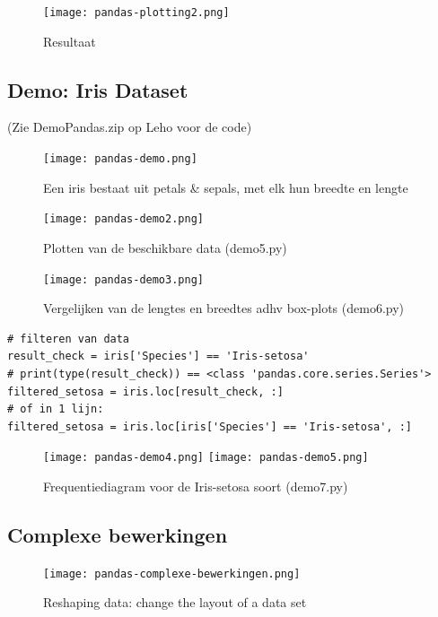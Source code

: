 \documentclass{article}
\begin{document}
\begin{figure}[H]
    \centering
    \texttt{[image: pandas-plotting2.png]}
    \caption{Resultaat}
\end{figure}

\subsection{Demo: Iris Dataset}

(Zie DemoPandas.zip op Leho voor de code)

\begin{figure}[H]
    \centering
    \texttt{[image: pandas-demo.png]}
    \caption{Een iris bestaat uit petals \& sepals, met elk hun breedte en lengte}
\end{figure}

\begin{figure}[H]
    \centering
    \texttt{[image: pandas-demo2.png]}
    \caption{Plotten van de beschikbare data (demo5.py)}
\end{figure}

\begin{figure}[H]
    \centering
    \texttt{[image: pandas-demo3.png]}
    \caption{Vergelijken van de lengtes en breedtes adhv box-plots (demo6.py)}
\end{figure}

\begin{verbatim}
# filteren van data
result_check = iris['Species'] == 'Iris-setosa'
# print(type(result_check)) == <class 'pandas.core.series.Series'>
filtered_setosa = iris.loc[result_check, :]
# of in 1 lijn:
filtered_setosa = iris.loc[iris['Species'] == 'Iris-setosa', :]
\end{verbatim}

\begin{figure}[H]
    \centering
    \texttt{[image: pandas-demo4.png]}
    \texttt{[image: pandas-demo5.png]}
    \caption{Frequentiediagram voor de Iris-setosa soort (demo7.py)}
\end{figure}

\subsection{Complexe bewerkingen}

\begin{figure}[H]
    \centering
    \texttt{[image: pandas-complexe-bewerkingen.png]}
    \caption{Reshaping data: change the layout of a data set}
\end{figure}
\end{document}
